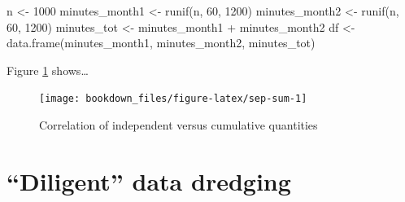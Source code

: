 \documentclass[
]{krantz}
\makeatletter
\newenvironment{Shaded}{\begin{snugshade}}{\end{snugshade}}
\newcommand{\DecValTok}[1]{\textcolor[rgb]{0.06,0.06,0.06}{#1}}
\newcommand{\FunctionTok}[1]{\textcolor[rgb]{0,0,0}{#1}}
\newcommand{\NormalTok}[1]{#1}
\newcommand{\OtherTok}[1]{\textcolor[rgb]{0.37,0.37,0.37}{#1}}
\newcommand{\SpecialCharTok}[1]{\textcolor[rgb]{0,0,0}{#1}}
\newenvironment{kframe}{%
\medskip{}
\setlength{\fboxsep}{.8em}
 \def\at@end@of@kframe{}%
 \ifinner\ifhmode%
  \def\at@end@of@kframe{\end{minipage}}%
  \begin{minipage}{\columnwidth}%
 \fi\fi%
 \def\FrameCommand##1{\hskip\@totalleftmargin \hskip-\fboxsep
 \colorbox{shadecolor}{##1}\hskip-\fboxsep
     \hskip-\linewidth \hskip-\@totalleftmargin \hskip\columnwidth}%
 \MakeFramed {\advance\hsize-\width
   \@totalleftmargin\z@ \linewidth\hsize
   \@setminipage}}%
 {\par\unskip\endMakeFramed%
 \at@end@of@kframe}
\renewenvironment{Shaded}{\begin{kframe}}{\end{kframe}}
\makeatother
\begin{document}
\begin{Shaded}
\begin{Highlighting}[]
\NormalTok{n }\OtherTok{\textless{}{-}} \DecValTok{1000}
\NormalTok{minutes\_month1 }\OtherTok{\textless{}{-}} \FunctionTok{runif}\NormalTok{(n, }\DecValTok{60}\NormalTok{, }\DecValTok{1200}\NormalTok{)}
\NormalTok{minutes\_month2 }\OtherTok{\textless{}{-}} \FunctionTok{runif}\NormalTok{(n, }\DecValTok{60}\NormalTok{, }\DecValTok{1200}\NormalTok{) }
\NormalTok{minutes\_tot }\OtherTok{\textless{}{-}}\NormalTok{ minutes\_month1 }\SpecialCharTok{+}\NormalTok{ minutes\_month2}
\NormalTok{df }\OtherTok{\textless{}{-}} \FunctionTok{data.frame}\NormalTok{(minutes\_month1, minutes\_month2, minutes\_tot)}
\end{Highlighting}
\end{Shaded}

Figure \ref{fig:sep-sum} shows\ldots{}

\begin{figure}

{\centering \texttt{[image: bookdown\_files/figure-latex/sep-sum-1]} 

}

\caption{Correlation of independent versus cumulative quantities}\label{fig:sep-sum}
\end{figure}

\hypertarget{diligent-data-dredging}{%
\section{``Diligent'' data dredging}\label{diligent-data-dredging}}
\end{document}
